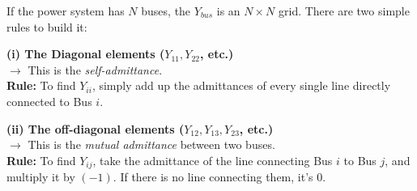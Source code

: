 \documentclass[11pt]{article}
\begin{document}
If the power system has $N$ buses, the $Y_{bus}$ is an $N \times N$ grid. There are two simple rules to build it:

\begin{conceptbox}
\textbf{(i) The Diagonal elements ($Y_{11}, Y_{22}$, etc.)} \\
$\rightarrow$ This is the \textit{self-admittance}. \\
\textbf{Rule:} To find $Y_{ii}$, simply add up the admittances of every single line directly connected to Bus $i$.

\vspace{0.3cm}
\textbf{(ii) The off-diagonal elements ($Y_{12}, Y_{13}, Y_{23}$, etc.)} \\
$\rightarrow$ This is the \textit{mutual admittance} between two buses. \\
\textbf{Rule:} To find $Y_{ij}$, take the admittance of the line connecting Bus $i$ to Bus $j$, and multiply it by $(-1)$. If there is no line connecting them, it's 0.
\end{conceptbox}
\end{document}
